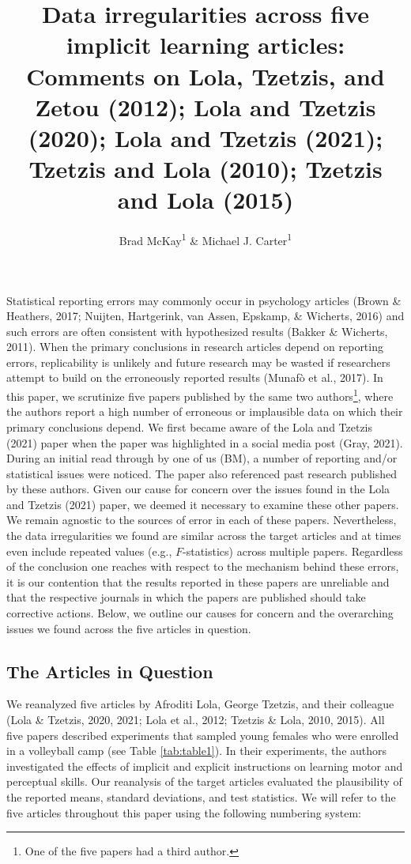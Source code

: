 \documentclass[
  english,
  man, donotrepeattitle,floatsintext]{apa7}
\title{Data irregularities across five implicit learning articles: Comments on Lola, Tzetzis, and Zetou (2012); Lola and Tzetzis (2020); Lola and Tzetzis (2021); Tzetzis and Lola (2010); Tzetzis and Lola (2015)}
\author{Brad McKay\textsuperscript{1} \& Michael J. Carter\textsuperscript{1}}
\date{}
\affiliation{\vspace{0.5cm}\textsuperscript{1} Department of Kinesiology, McMaster University}
\begin{document}
\maketitle

Statistical reporting errors may commonly occur in psychology articles (Brown \& Heathers, 2017; Nuijten, Hartgerink, van Assen, Epskamp, \& Wicherts, 2016) and such errors are often consistent with hypothesized results (Bakker \& Wicherts, 2011). When the primary conclusions in research articles depend on reporting errors, replicability is unlikely and future research may be wasted if researchers attempt to build on the erroneously reported results (Munafò et al., 2017). In this paper, we scrutinize five papers published by the same two authors\footnote{One of the five papers had a third author.}, where the authors report a high number of erroneous or implausible data on which their primary conclusions depend. We first became aware of the Lola and Tzetzis (2021) paper when the paper was highlighted in a social media post (Gray, 2021). During an initial read through by one of us (BM), a number of reporting and/or statistical issues were noticed. The paper also referenced past research published by these authors. Given our cause for concern over the issues found in the Lola and Tzetzis (2021) paper, we deemed it necessary to examine these other papers. We remain agnostic to the sources of error in each of these papers. Nevertheless, the data irregularities we found are similar across the target articles and at times even include repeated values (e.g., \(F\)-statistics) across multiple papers. Regardless of the conclusion one reaches with respect to the mechanism behind these errors, it is our contention that the results reported in these papers are unreliable and that the respective journals in which the papers are published should take corrective actions. Below, we outline our causes for concern and the overarching issues we found across the five articles in question.

\hypertarget{the-articles-in-question}{%
\subsection{The Articles in Question}\label{the-articles-in-question}}

We reanalyzed five articles by Afroditi Lola, George Tzetzis, and their colleague (Lola \& Tzetzis, 2020, 2021; Lola et al., 2012; Tzetzis \& Lola, 2010, 2015). All five papers described experiments that sampled young females who were enrolled in a volleyball camp (see Table \ref{tab:table1}). In their experiments, the authors investigated the effects of implicit and explicit instructions on learning motor and perceptual skills. Our reanalysis of the target articles evaluated the plausibility of the reported means, standard deviations, and test statistics. We will refer to the five articles throughout this paper using the following numbering system:
\end{document}

